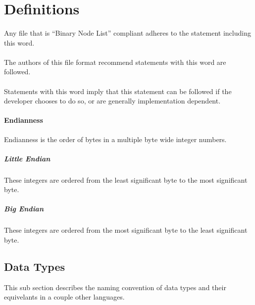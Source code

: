 \section{Definitions}

\paragraph{\Must}
Any file that is ``Binary Node List'' compliant adheres to the statement including
this word.

\paragraph{\Should}
The authors of this file format recommend statements with this word are followed.

\paragraph{\May}
Statements with this word imply that this statement can be followed if the 
developer chooses to do so, or are generally implementation dependent.

\paragraph{Endianness}
Endianness is the order of bytes in a multiple byte wide integer numbers.

\subparagraph{Little Endian}
These integers are ordered from the least significant byte to the most
significant byte.

\subparagraph{Big Endian}
These integers are ordered from the most significant byte to the least
significant byte.

\subsection{Data Types}
This sub section describes the naming convention of data types and their equivelants
in a couple other languages.

